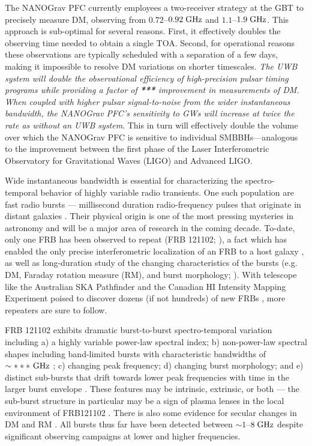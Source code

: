 \documentclass[10pt]{myNSF}
\begin{document}
The NANOGrav PFC currently employees a two-receiver strategy at the
GBT to precisely measure DM, observing from $0.72$--$0.92\; \textrm{GHz}$ and
$1.1$--$1.9\; \textrm{GHz}$.  This approach is sub-optimal for several reasons.
First, it effectively doubles the observing time needed to obtain a
single TOA.  Second, for operational reasons these observations are
typically scheduled with a separation of a few days, making it
impossible to resolve DM variations on shorter timescales.  \emph{The
  UWB system will double the observational efficiency of
  high-precision pulsar timing programs while providing a factor of
  \textbf{***} improvement in measurements of DM.  When coupled with
  higher pulsar signal-to-noise from the wider instantaneous
  bandwidth, the NANOGrav PFC's sensitivity to GWs will increase at
  twice the rate as without an UWB system}.  This in turn will
effectively double the volume over which the NANOGrav PFC is sensitive
to individual SMBBHs---analogous to the improvement between the first
phase of the Laser Interferometric Observatory for Gravitational Waves
(LIGO) and Advanced LIGO.

 Wide instantaneous bandwidth is
essential for characterizing the spectro-temporal behavior of highly
variable radio transients.  One such population are fast radio bursts
--- millisecond duration radio-frequency pulses that originate in
distant galaxies \citep{lbm+07,tsb+13}.  Their physical origin is one
of the most pressing mysteries in astronomy and will be a major area
of research in the coming decade.  To-date, only one FRB has been
observed to repeat (FRB 121102; \cite{sch+14,ssh+16a}), a fact which
has enabled the only precise interferometric localization of an FRB to
a host galaxy \citep{clw+17,tbc+17}, as well as long-duration study of
the changing characteristics of the bursts (e.g. DM, Faraday rotation
measure (RM), and burst morphology; \cite{msh+18}).  With telescope
like the Australian SKA Pathfinder and the Canadian HI Intensity
Mapping Experiment poised to discover dozens (if not hundreds) of new
FRBs \citep{smb+18,chime18}, more repeaters are sure to follow.

FRB 121102 exhibits dramatic burst-to-burst spectro-temporal variation
including a) a highly variable power-law spectral index; b)
non-power-law spectral shapes including band-limited bursts with
characteristic bandwidths of $\sim***\ \GHz$ ; c) changing peak
frequency; d) changing burst morphology; and e) distinct sub-bursts
that drift towards lower peak frequencies with time in the larger
burst envelope \citep{ssh+16b}.  These features may be intrinsic,
extrinsic, or both --- the sub-burst structure in particular may be a
sign of plasma lenses in the local environment of FRB121102
\citep{cwh+17,myc+18}.  There is also some evidence for secular
changes in DM and RM \citep{msh+18,gsp+18}.  All bursts thus far have
been detected between $\sim 1$--$8\; \textrm{GHz}$ despite significant
observing campaigns at lower and higher frequencies.
\end{document}
